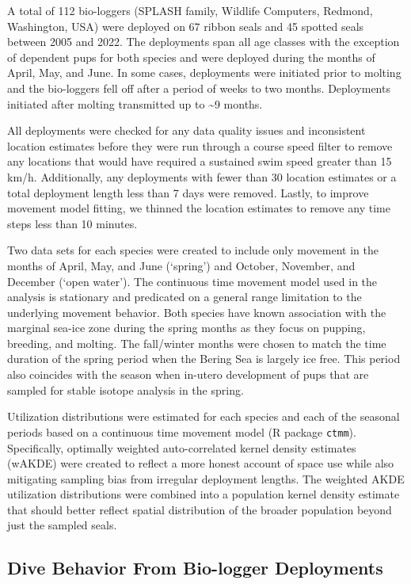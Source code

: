 \documentclass[
  letterpaper,
  DIV=11,
  numbers=noendperiod]{scrartcl}
\begin{document}
A total of 112 bio-loggers (SPLASH family, Wildlife Computers, Redmond,
Washington, USA) were deployed on 67 ribbon seals and 45 spotted seals
between 2005 and 2022. The deployments span all age classes with the
exception of dependent pups for both species and were deployed during
the months of April, May, and June. In some cases, deployments were
initiated prior to molting and the bio-loggers fell off after a period
of weeks to two months. Deployments initiated after molting transmitted
up to \textasciitilde9 months.

All deployments were checked for any data quality issues and
inconsistent location estimates before they were run through a course
speed filter to remove any locations that would have required a
sustained swim speed greater than 15 km/h. Additionally, any deployments
with fewer than 30 location estimates or a total deployment length less
than 7 days were removed. Lastly, to improve movement model fitting, we
thinned the location estimates to remove any time steps less than 10
minutes.

Two data sets for each species were created to include only movement in
the months of April, May, and June (`spring') and October, November, and
December (`open water'). The continuous time movement model used in the
analysis is stationary and predicated on a general range limitation to
the underlying movement behavior. Both species have known association
with the marginal sea-ice zone during the spring months as they focus on
pupping, breeding, and molting. The fall/winter months were chosen to
match the time duration of the spring period when the Bering Sea is
largely ice free. This period also coincides with the season when
in-utero development of pups that are sampled for stable isotope
analysis in the spring.

Utilization distributions were estimated for each species and each of
the seasonal periods based on a continuous time movement model (R
package \texttt{ctmm}). Specifically, optimally weighted auto-correlated
kernel density estimates (wAKDE) were created to reflect a more honest
account of space use while also mitigating sampling bias from irregular
deployment lengths. The weighted AKDE utilization distributions were
combined into a population kernel density estimate that should better
reflect spatial distribution of the broader population beyond just the
sampled seals.

\subsection{Dive Behavior From Bio-logger
Deployments}\label{dive-behavior-from-bio-logger-deployments}
\end{document}
